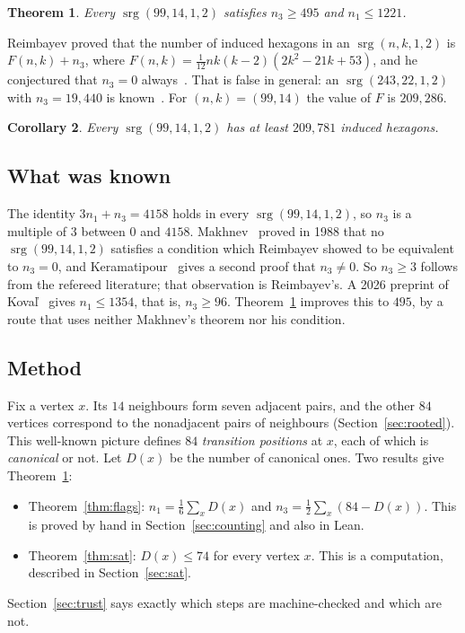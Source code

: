 \documentclass[11pt]{amsart}
\newtheorem{theorem}{Theorem}
\newtheorem{corollary}[theorem]{Corollary}
\theoremstyle{remark}
\newcommand{\srg}{\operatorname{srg}}
\begin{document}
\begin{theorem}\label{thm:main}
Every $\srg(99,14,1,2)$ satisfies $n_3\ge495$ and $n_1\le1221$.
\end{theorem}

Reimbayev proved that the number of induced hexagons in an $\srg(n,k,1,2)$ is
$F(n,k)+n_3$, where $F(n,k)=\frac1{12}nk(k-2)(2k^2-21k+53)$, and he
conjectured that $n_3=0$ always~\cite{Reimbayev}. That is false in general: an
$\srg(243,22,1,2)$ with $n_3=19{,}440$ is known~\cite{Djematene}. For
$(n,k)=(99,14)$ the value of $F$ is $209{,}286$.

\begin{corollary}\label{cor:hexagons}
Every $\srg(99,14,1,2)$ has at least $209{,}781$ induced hexagons.
\end{corollary}

\subsection*{What was known}
The identity $3n_1+n_3=4158$ holds in every $\srg(99,14,1,2)$, so $n_3$ is a
multiple of $3$ between $0$ and $4158$. Makhnev~\cite{Makhnev} proved in 1988
that no $\srg(99,14,1,2)$ satisfies a condition which Reimbayev showed to be
equivalent to $n_3=0$, and Keramatipour~\cite[Theorem~3.4.2]{Keramatipour}
gives a second proof that $n_3\ne0$. So $n_3\ge3$ follows from the refereed
literature; that observation is Reimbayev's. A 2026 preprint of
Kova\v{l}~\cite[Corollary~3.3]{Koval} gives $n_1\le1354$, that is, $n_3\ge96$.
Theorem~\ref{thm:main} improves this to $495$, by a route that uses neither
Makhnev's theorem nor his condition.

\subsection*{Method}
Fix a vertex $x$. Its $14$ neighbours form seven adjacent pairs, and the other
$84$ vertices correspond to the nonadjacent pairs of neighbours
(Section~\ref{sec:rooted}). This well-known picture defines $84$
\emph{transition positions} at $x$, each of which is \emph{canonical} or not.
Let $D(x)$ be the number of canonical ones. Two results give
Theorem~\ref{thm:main}:
\begin{itemize}
\item Theorem~\ref{thm:flags}: $n_1=\frac16\sum_xD(x)$ and
$n_3=\frac12\sum_x(84-D(x))$. This is proved by hand in
Section~\ref{sec:counting} and also in Lean.
\item Theorem~\ref{thm:sat}: $D(x)\le74$ for every vertex $x$. This is a
computation, described in Section~\ref{sec:sat}.
\end{itemize}
Section~\ref{sec:trust} says exactly which steps are machine-checked and which
are not.
\end{document}

